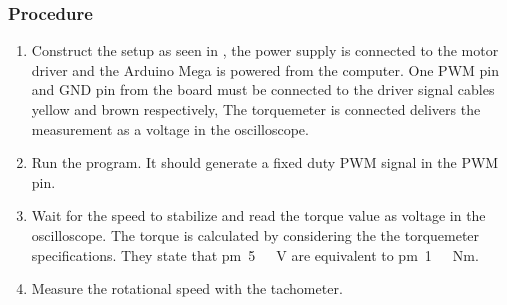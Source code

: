 \subsubsection{Procedure}
\begin{enumerate}
	\item Construct the setup as seen in , the power supply is connected to the motor driver and the Arduino Mega is powered from the computer. One PWM pin and GND pin from the board must be connected to the driver signal cables yellow and brown respectively, The torquemeter is connected delivers the measurement as a voltage in the oscilloscope. 
	\item Run the program. It should generate a fixed duty PWM signal in the PWM pin.
	\item Wait for the speed to stabilize and read the torque value as voltage in the oscilloscope. The torque is calculated by considering the the torquemeter specifications. They state that \si{\pm5\ V} are equivalent to \si{\pm1\ Nm}.
	\item Measure the rotational speed with the tachometer.
\end{enumerate}


